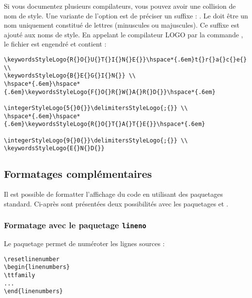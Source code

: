 Si vous documentez plusieurs compilateurs, vous pouvez avoir une collision de nom de style. Une variante de l'option  est de préciser un suffixe : . Le  doit être un nom uniquement constitué de lettres (minuscules ou majuscules). Ce suffixe est ajouté aux noms de style. En appelant le compilateur LOGO par la commande , le fichier  est engendré et contient :

\begin{verbatim}
\keywordsStyleLogo{R{}O{}U{}T{}I{}N{}E{}}\hspace*{.6em}t{}r{}a{}c{}e{} \\
\keywordsStyleLogo{B{}E{}G{}I{}N{}} \\
\hspace*{.6em}\hspace*{.6em}\keywordsStyleLogo{F{}O{}R{}W{}A{}R{}D{}}\hspace*{.6em}
                              \integerStyleLogo{5{}0{}}\delimitersStyleLogo{;{}} \\
\hspace*{.6em}\hspace*{.6em}\keywordsStyleLogo{R{}O{}T{}A{}T{}E{}}\hspace*{.6em}
                              \integerStyleLogo{9{}0{}}\delimitersStyleLogo{;{}} \\
\keywordsStyleLogo{E{}N{}D{}}
\end{verbatim}




\subsection{Formatages complémentaires}

Il est possible de formatter l'affichage du code en utilisant des paquetages standard. Ci-après sont présentées deux possibilités avec les paquetages  et .

\subsubsection{Formatage avec le paquetage \texttt{lineno}}

Le paquetage  permet de numéroter les lignes sources :
\begin{verbatim}
\resetlinenumber
\begin{linenumbers}
\ttfamily
...
\end{linenumbers}
\end{verbatim}

